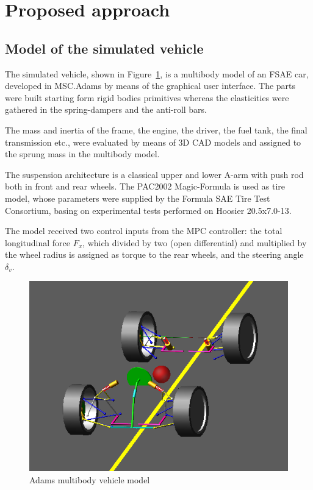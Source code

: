 \documentclass[conference]{IEEEtran} %
\begin{document}

\section{Proposed approach} %


\subsection{Model of the simulated vehicle}
The simulated vehicle, shown in Figure~\ref{fig:Adams_vehicle}, is a multibody model of an FSAE car, developed in MSC.Adams by means of the graphical user interface. The parts were built starting form rigid bodies primitives whereas the elasticities were gathered in the spring-dampers and the anti-roll bars.

The mass and inertia of the frame, the engine, the driver, the fuel
tank, the final transmission etc.,  were evaluated by means of 3D CAD models and
assigned to the sprung mass in the multibody model.

The suspension architecture is a classical upper and lower A-arm with push rod both in front and rear wheels. The PAC2002 Magic-Formula is used as tire model, whose parameters were supplied by the Formula SAE Tire Test Consortium, basing on experimental tests performed on Hoosier 20.5x7.0-13.

The model received two control inputs from the MPC controller: the total longitudinal force $F_{x}$, which divided by two (open differential) and multiplied by the wheel radius is assigned as torque to the rear wheels, and the steering angle $\delta_v$.

\begin{figure}[htb] \centering
	
	\includegraphics[width=0.8\linewidth]{adams_vehicle}
	
	\caption{Adams multibody vehicle model}
	
	\label{fig:Adams_vehicle}
	
\end{figure}
\end{document}
